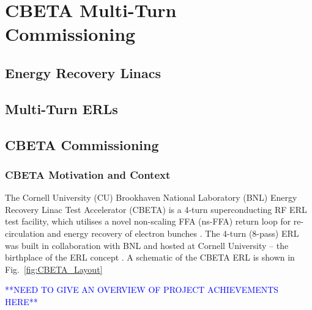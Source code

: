 \documentclass[../main.tex]{subfiles}
\begin{document}
\chapter{CBETA Multi-Turn Commissioning}
\label{CBETA_Multi-Pass_Commissioning} %

\section{Energy Recovery Linacs}

\section{Multi-Turn ERLs}

\section{CBETA Commissioning}
\subsection{CBETA Motivation and Context}

The Cornell University (CU) Brookhaven National Laboratory (BNL) Energy Recovery Linac Test Accelerator (CBETA) is a 4-turn superconducting RF ERL test facility, which utilises a novel non-scaling FFA (ns-FFA) return loop for re-circulation and energy recovery of electron bunches \cite{hoffstaetter2017cbeta,bartnik2020cbeta}. The 4-turn (8-pass) ERL was built in collaboration with BNL and hosted at Cornell University -- the birthplace of the ERL concept \cite{tigner1965possible}. A schematic of the CBETA ERL is shown in Fig.~\ref{fig:CBETA_Layout}

\textcolor{blue}{**NEED TO GIVE AN OVERVIEW OF PROJECT ACHIEVEMENTS HERE**}
\end{document}
